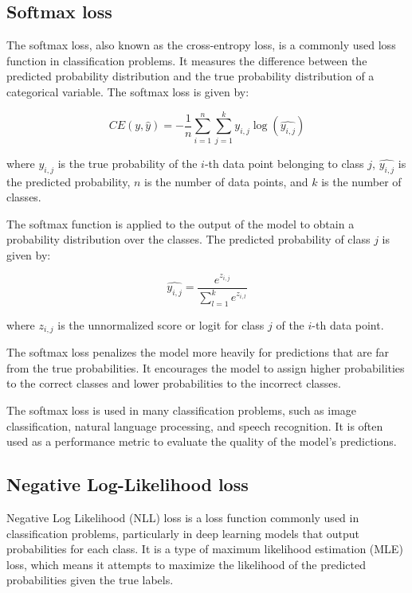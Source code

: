 \subsection{Softmax loss}
\label{subsec:3_softmax_loss}

The softmax loss, also known as the cross-entropy loss, is a commonly used loss function in classification problems. It measures the difference between the predicted probability distribution and the true probability distribution of a categorical variable. The softmax loss is given by:

\begin{equation}
	CE(y, \hat{y}) = -\frac{1}{n}\sum_{i=1}^{n}\sum_{j=1}^{k} y_{i,j}\log(\hat{y_{i,j}})
\end{equation}

where $y_{i,j}$ is the true probability of the $i$-th data point belonging to class $j$, $\hat{y_{i,j}}$ is the predicted probability, $n$ is the number of data points, and $k$ is the number of classes.

The softmax function is applied to the output of the model to obtain a probability distribution over the classes. The predicted probability of class $j$ is given by:

\begin{equation}
	\hat{y_{i,j}} = \frac{e^{z_{i,j}}}{\sum_{l=1}^{k} e^{z_{i,l}}}
\end{equation}

where $z_{i,j}$ is the unnormalized score or logit for class $j$ of the $i$-th data point.

The softmax loss penalizes the model more heavily for predictions that are far from the true probabilities. It encourages the model to assign higher probabilities to the correct classes and lower probabilities to the incorrect classes.

The softmax loss is used in many classification problems, such as image classification, natural language processing, and speech recognition. It is often used as a performance metric to evaluate the quality of the model's predictions.

\subsection{Negative Log-Likelihood loss}
\label{subsec:3_NLL_loss}

Negative Log Likelihood (NLL) loss is a loss function commonly used in classification problems, particularly in deep learning models that output probabilities for each class. It is a type of maximum likelihood estimation (MLE) loss, which means it attempts to maximize the likelihood of the predicted probabilities given the true labels.

